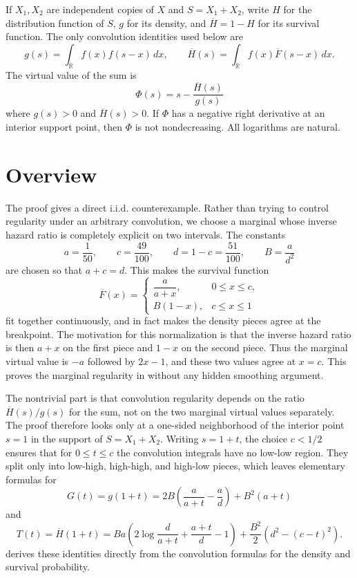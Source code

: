 \documentclass[11pt]{article}
\begin{document}
If $X_1,X_2$ are independent copies of $X$ and $S=X_1+X_2$, write $H$ for the
distribution function of $S$, $g$ for its density, and
$\overline H=1-H$ for its survival function.  The only convolution identities
used below are
\begin{equation}
\label{eq:convolution-identities}
g(s)=\int_{\mathbb R} f(x)f(s-x)\,dx,
\qquad
\overline H(s)=\int_{\mathbb R} f(x)\overline F(s-x)\,dx.
\end{equation}
The virtual value of the sum is
\begin{equation}
\label{eq:sum-virtual-value}
\Phi(s)=s-\frac{\overline H(s)}{g(s)}
\end{equation}
where $g(s)>0$ and $\overline H(s)>0$.  If $\Phi$ has a negative right
derivative at an interior support point, then $\Phi$ is not nondecreasing.  All
logarithms are natural.

\section{Overview}
\label{sec:overview}

The proof gives a direct i.i.d. counterexample.  Rather than trying to control
regularity under an arbitrary convolution, we choose a marginal whose inverse
hazard ratio is completely explicit on two intervals.  The constants
\[
a=\frac1{50},\qquad c=\frac{49}{100},\qquad d=1-c=\frac{51}{100},
\qquad B=\frac{a}{d^2}
\]
are chosen so that $a+c=d$.  This makes the survival function
\[
\overline F(x)=
\begin{cases}
\dfrac{a}{a+x}, & 0\leq x\leq c,\\[6pt]
B(1-x), & c\leq x\leq 1
\end{cases}
\]
fit together continuously, and in fact makes the density pieces agree at the
breakpoint.  The motivation for this normalization is that the inverse hazard
ratio is then $a+x$ on the first piece and $1-x$ on the second piece.  Thus the
marginal virtual value is $-a$ followed by $2x-1$, and these two values agree
at $x=c$.  This proves the marginal regularity in
 without any hidden smoothing argument.

The nontrivial part is that convolution regularity depends on the ratio
$\overline H(s)/g(s)$ for the sum, not on the two marginal virtual values
separately.  The proof therefore looks only at a one-sided neighborhood of the
interior point $s=1$ in the support of $S=X_1+X_2$.  Writing $s=1+t$, the
choice $c<1/2$ ensures that for $0\leq t\leq c$ the convolution integrals have
no low-low region.  They split only into low-high, high-high, and high-low
pieces, which leaves elementary formulas for
\[
G(t)=g(1+t)
=
2B\left(\frac{a}{a+t}-\frac{a}{d}\right)+B^2(a+t)
\]
and
\[
T(t)=\overline H(1+t)
=
Ba\left(2\log\frac{d}{a+t}+\frac{a+t}{d}-1\right)
+\frac{B^2}{2}\left(d^2-(c-t)^2\right).
\]
 derives these identities directly from
the convolution formulas for the density and survival probability.
\end{document}
